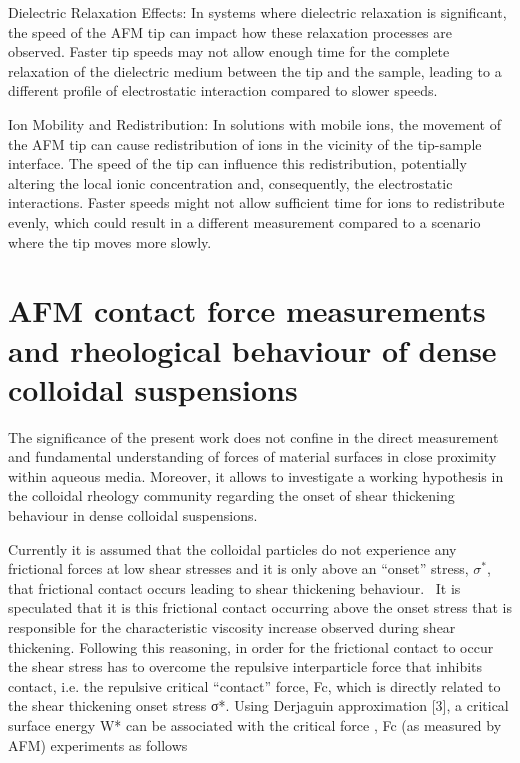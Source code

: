 Dielectric Relaxation Effects: In systems where dielectric relaxation is significant, the speed of the AFM tip can impact how these relaxation processes are observed. Faster tip speeds may not allow enough time for the complete relaxation of the dielectric medium between the tip and the sample, leading to a different profile of electrostatic interaction compared to slower speeds.

Ion Mobility and Redistribution: In solutions with mobile ions, the movement of the AFM tip can cause redistribution of ions in the vicinity of the tip-sample interface. The speed of the tip can influence this redistribution, potentially altering the local ionic concentration and, consequently, the electrostatic interactions. Faster speeds might not allow sufficient time for ions to redistribute evenly, which could result in a different measurement compared to a scenario where the tip moves more slowly.

\section*{AFM contact force measurements and rheological behaviour of dense colloidal suspensions}

The significance of the present work does not confine in the direct measurement and fundamental understanding of forces of material surfaces in close proximity within aqueous media. Moreover, it allows to investigate a working hypothesis in the colloidal rheology community regarding the onset of shear thickening behaviour in dense colloidal suspensions.~\cite{reference1}

Currently it is assumed that the colloidal particles do not experience any frictional forces at low shear stresses and it is only above an ``onset'' stress, $\sigma^*$, that frictional contact occurs leading to shear thickening behaviour.~\cite{reference2} It is speculated that it is this frictional contact occurring above the onset stress that is responsible for the characteristic viscosity increase observed during shear thickening. Following this reasoning, in order for the frictional contact to occur the shear stress has to overcome the repulsive interparticle force that inhibits contact, i.e. the repulsive critical “contact” force, Fc, which is directly related to the shear thickening onset stress σ*. Using Derjaguin approximation [3], a critical surface energy W* can be associated with the critical force , Fc (as measured by AFM) experiments as follows

